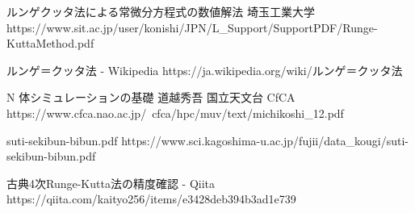 \documentclass[a4paper,twoside]{jarticle}
\begin{document}
\begin{thebibliography}{99}
ルンゲクッタ法による常微分方程式の数値解法 埼玉工業大学
https://www.sit.ac.jp/user/konishi/JPN/L\_Support/SupportPDF/Runge-KuttaMethod.pdf

ルンゲ＝クッタ法 - Wikipedia
https://ja.wikipedia.org/wiki/ルンゲ＝クッタ法

N 体シミュレーションの基礎 道越秀吾 国立天文台 CfCA
https://www.cfca.nao.ac.jp/~cfca/hpc/muv/text/michikoshi\_12.pdf

suti-sekibun-bibun.pdf
https://www.sci.kagoshima-u.ac.jp/fujii/data\_kougi/suti-sekibun-bibun.pdf

古典4次Runge-Kutta法の精度確認 - Qiita
https://qiita.com/kaityo256/items/e3428deb394b3ad1e739

\end{thebibliography}
\end{document}
